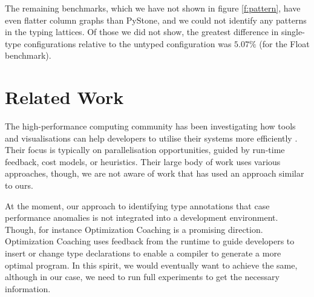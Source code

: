\documentclass[sigplan,screen]{acmart}
\begin{document}
The remaining benchmarks, which we have not shown in figure \ref{f:pattern}, have even flatter column graphs than PyStone, and we could not identify any patterns in the typing lattices. Of those we did not show, the greatest difference in single-type configurations relative to the untyped configuration was $5.07\%$ (for the Float benchmark).


\section{Related Work}
\label{s-rel}

The high-performance computing community has been investigating how
tools and visualisations can help developers to utilise their systems
more efficiently \citep{Papenhausen:2016:IVT,daSilva:2019:PSV}.
Their focus is typically on parallelisation opportunities,
guided by run-time feedback, cost models, or heuristics. 
Their large body of work \citep{Isaacs:2014:PerfViz} uses various approaches,
though, we are not aware of work that has used an approach similar to ours.

At the moment, our approach to identifying type annotations that case
performance anomalies is not integrated into a development environment.
Though, for instance Optimization Coaching
\citep{St-Amour:2012:OCO} is a promising direction.
Optimization Coaching uses feedback from the runtime to guide developers
to insert or change type declarations 
to enable a compiler to generate a more optimal program.
In this spirit, we would eventually want to achieve the same, although
in our case,
we need to run full experiments to get the necessary information.
\end{document}
